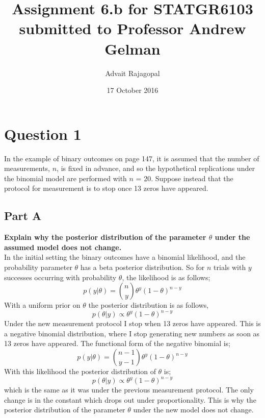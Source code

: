 \documentclass{article}
\title{Assignment 6.b for \textbf{STATGR6103}\\
\large submitted to Professor Andrew Gelman}
\date{17 October 2016}
\author{Advait Rajagopal}
\begin{document}
  \maketitle
\section{Question 1}
In the example of binary outcomes on page 147, it is assumed that the number of measurements, $n$, is fixed in advance, and so the hypothetical replications under the binomial model are performed with $n$ = 20. Suppose instead that the protocol for measurement is to stop once 13 zeros have appeared.
\subsection{Part A}
\textbf{Explain why the posterior distribution of the parameter $\theta$ under the assumed model does not change.}\\
In the initial setting the binary outcomes have a binomial likelihood, and the probability parameter $\theta$ has a beta posterior distribution. So for $n$ trials with $y$ successes occurring with probability $\theta$, the likelihood is as follows;
$$p(y|\theta) = {n \choose y}  \theta^{y} (1-\theta)^{n-y}$$
With a uniform prior on $\theta$ the posterior distribution is as follows,
$$p(\theta|y) \propto  \theta^{y} (1-\theta)^{n-y}$$
Under the new measurement protocol I stop when 13 zeros have appeared. This is a negative binomial distribution, where I stop generating new numbers as soon as 13 zeros have appeared. The functional form of the negative binomial is;
$$p(y|\theta) = {n-1 \choose y-1}  \theta^{y} (1-\theta)^{n-y}$$
With this likelihood the posterior distribution of $\theta$ is;
$$p(\theta|y) \propto  \theta^{y} (1-\theta)^{n-y}$$
which is the same as it was under the previous measurement protocol. The only change is in the constant which drops out under proportionality. This is why the posterior distribution of the parameter $\theta$ under the new model does not change.
\end{document}
